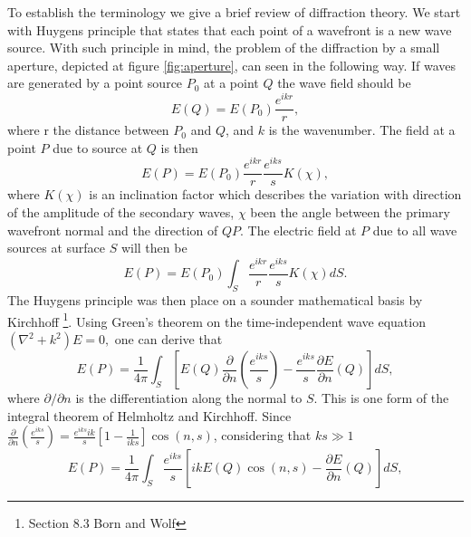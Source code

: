 \documentclass[12pt,twoside,english]{book}
\renewcommand{\~}{\perispomeni}%
\numberwithin{equation}{section}
\numberwithin{figure}{section}
\begin{document}
To establish the terminology we give a brief review of diffraction theory. We start with Huygens principle that states that each point of a wavefront is a new wave source. With such principle in mind, the problem of the diffraction by a small aperture, depicted at figure \ref{fig:aperture}, can seen in the following way. If waves are generated by a point source $P_{0}$ at a point $Q$ the wave field should be
\begin{equation}
E\left(Q\right)=E\left(P_{0}\right)\frac{e^{ikr}}{r},
\label{}
\end{equation}
where r the distance between $P_{0}$ and $Q$, and $k$ is the wavenumber. The field at a point $P$ due to source at $Q$ is then
\begin{equation}
E\left(P\right)=E\left(P_{0}\right)\frac{e^{ikr}}{r}\frac{e^{iks}}{s}K\left(\chi\right),
\end{equation}
where $K\left(\chi\right)$ is an inclination factor which describes the variation with direction of the amplitude of the secondary waves, $\chi$ been the angle between the primary wavefront normal and the direction of $QP$. The electric field at $P$ due to all wave sources at surface $S$ will then be
\begin{equation}
E\left(P\right)=E\left(P_{0}\right)\int_{S}\frac{e^{ikr}}{r}\frac{e^{iks}}{s}K\left(\chi\right)dS.
\label{eq:huygens formula}
\end{equation}
The Huygens principle was then place on a sounder mathematical basis by Kirchhoff \footnote{Section 8.3 Born and Wolf}. Using Green's theorem on the time-independent wave equation $\left(\nabla^{2}+k^{2}\right)E=0,$ one can derive that
\begin{equation}
E\left(P\right)=\frac{1}{4\pi}\int_{S}\left[E\left(Q\right)\frac{\partial}{\partial n}\left(\frac{e^{iks}}{s}\right)-\frac{e^{iks}}{s}\frac{\partial E}{\partial n}\left(Q\right)\right]dS,
\end{equation}
where $\partial/\partial n$ is the differentiation along the normal to $S$. This is one form of the integral theorem of Helmholtz and Kirchhoff. Since $\frac{\partial}{\partial n}\left(\frac{e^{iks}}{s}\right)=\frac{e^{iks}ik}{s}\left[1-\frac{1}{iks}\right]\cos\left(n,s\right)$, considering that $ks\gg1$
\begin{equation}
E\left(P\right)=\frac{1}{4\pi}\int_{S}\frac{e^{iks}}{s}\left[ikE\left(Q\right)\cos\left(n,s\right)-\frac{\partial E}{\partial n}\left(Q\right)\right]dS,
\label{eq:integral theorem}
\end{equation}
\end{document}
